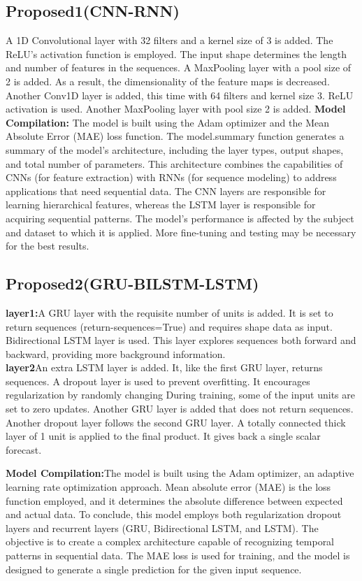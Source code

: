 \documentclass[a4paper,fleqn]{cas-sc}
\begin{document}
\subsection{Proposed1(CNN-RNN)}A 1D Convolutional layer with 32 filters and a kernel size of 3 is added. The ReLU's activation function is employed. The input shape determines the length and number of features in the sequences. A MaxPooling layer with a pool size of 2 is added. As a result, the dimensionality of the feature maps is decreased. Another Conv1D layer is added, this time with 64 filters and kernel size 3. ReLU activation is used.
Another MaxPooling layer with pool size 2 is added.
\textbf{Model Compilation:} The model is built using the Adam optimizer and the Mean Absolute Error (MAE) loss function. The model.summary function generates a summary of the model's architecture, including the layer types, output shapes, and total number of parameters. This architecture combines the capabilities of CNNs (for feature extraction) with RNNs (for sequence modeling) to address applications that need sequential data. The CNN layers are responsible for learning hierarchical features, whereas the LSTM layer is responsible for acquiring sequential patterns. The model's performance is affected by the subject and dataset to which it is applied. More fine-tuning and testing may be necessary for the best results.


\subsection{Proposed2(GRU-BILSTM-LSTM)}
\textbf{layer1:}A GRU layer with the requisite number of units is added. It is set to return sequences (return-sequences=True) and requires shape data as input. 
Bidirectional LSTM layer is used. This layer explores sequences both forward and backward, providing more background information.\\
\textbf{layer2}An extra LSTM layer is added. It, like the first GRU layer, returns sequences.
A dropout layer is used to prevent overfitting. It encourages regularization by randomly changing During training, some of the input units are set to zero updates.
Another GRU layer is added that does not return sequences.
Another dropout layer follows the second GRU layer.
A totally connected thick layer of 1 unit is applied to the final product. It gives back a single scalar forecast.

\textbf{Model Compilation:}The model is built using the Adam optimizer, an adaptive learning rate optimization approach. Mean absolute error (MAE) is the loss function employed, and it determines the absolute difference between expected and actual data. To conclude, this model employs both regularization dropout layers and recurrent layers (GRU, Bidirectional LSTM, and LSTM). The objective is to create a complex architecture capable of recognizing temporal patterns in sequential data. The MAE loss is used for training, and the model is designed to generate a single prediction for the given input sequence.
\end{document}
